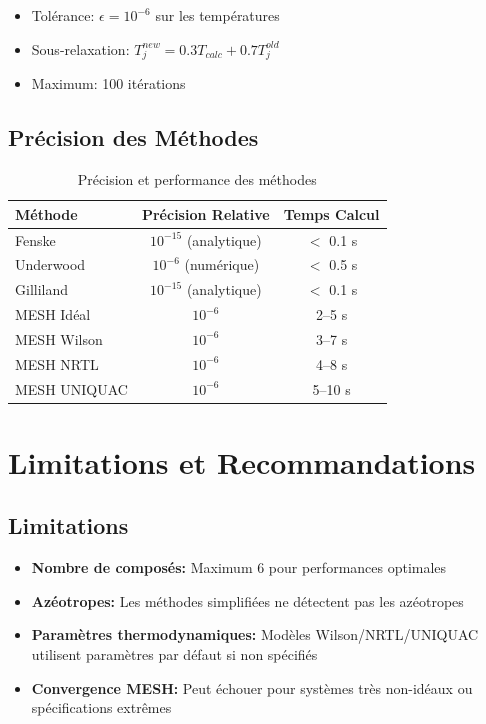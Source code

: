 \documentclass[11pt,a4paper]{article}
\begin{document}
\begin{itemize}[leftmargin=*]
    \item Tolérance: $\epsilon = 10^{-6}$ sur les températures
    \item Sous-relaxation: $T_j^{new} = 0.3 T_{calc} + 0.7 T_j^{old}$
    \item Maximum: 100 itérations
\end{itemize}

\subsection{Précision des Méthodes}

\begin{table}[h]
\centering
\begin{tabular}{lcc}
\toprule
\textbf{Méthode} & \textbf{Précision Relative} & \textbf{Temps Calcul} \\
\midrule
Fenske & $10^{-15}$ (analytique) & $<$ 0.1 s \\
Underwood & $10^{-6}$ (numérique) & $<$ 0.5 s \\
Gilliland & $10^{-15}$ (analytique) & $<$ 0.1 s \\
MESH Idéal & $10^{-6}$ & 2--5 s \\
MESH Wilson & $10^{-6}$ & 3--7 s \\
MESH NRTL & $10^{-6}$ & 4--8 s \\
MESH UNIQUAC & $10^{-6}$ & 5--10 s \\
\bottomrule
\end{tabular}
\caption{Précision et performance des méthodes}
\end{table}

\section{Limitations et Recommandations}

\subsection{Limitations}

\begin{itemize}[leftmargin=*]
    \item \textbf{Nombre de composés:} Maximum 6 pour performances optimales
    \item \textbf{Azéotropes:} Les méthodes simplifiées ne détectent pas les azéotropes
    \item \textbf{Paramètres thermodynamiques:} Modèles Wilson/NRTL/UNIQUAC utilisent paramètres par défaut si non spécifiés
    \item \textbf{Convergence MESH:} Peut échouer pour systèmes très non-idéaux ou spécifications extrêmes
\end{itemize}
\end{document}
